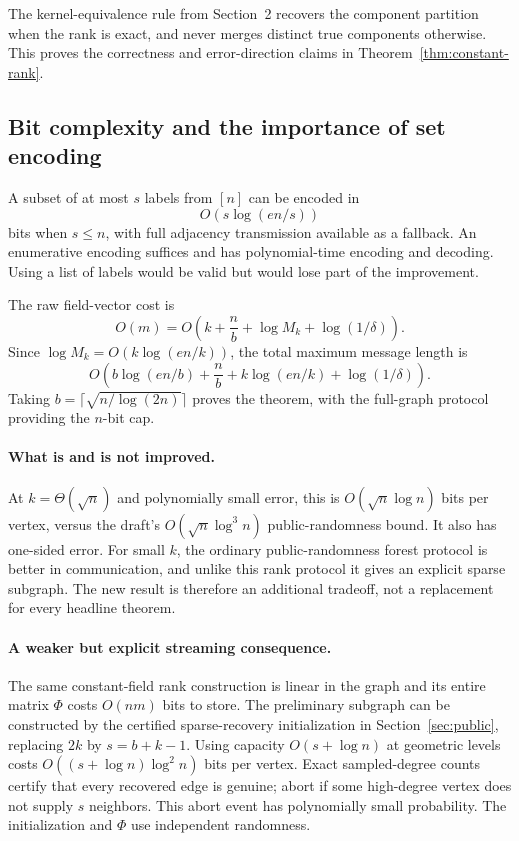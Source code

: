 \documentclass[11pt]{article}
\theoremstyle{remark}\newtheorem{remark}[theorem]{Remark}
\begin{document}
The kernel-equivalence rule from Section~2 recovers the component partition when the rank is exact, and never merges distinct true components otherwise. This proves the correctness and error-direction claims in Theorem~\ref{thm:constant-rank}.

\subsection{Bit complexity and the importance of set encoding}
A subset of at most $s$ labels from $[n]$ can be encoded in
\[
 O\!\left(s\log(en/s)\right)
\]
bits when $s\le n$, with full adjacency transmission available as a fallback. An enumerative encoding suffices and has polynomial-time encoding and decoding. Using a list of labels would be valid but would lose part of the improvement.

The raw field-vector cost is
\[
 O(m)=O\!\left(k+\frac nb+\log M_k+\log(1/\delta)\right).
\]
Since $\log M_k=O(k\log(en/k))$, the total maximum message length is
\[
 O\!\left(
 b\log(en/b)+\frac nb+k\log(en/k)+\log(1/\delta)
 \right).
\]
Taking $b=\lceil\sqrt{n/\log(2n)}\rceil$ proves the theorem, with the full-graph protocol providing the $n$-bit cap.

\paragraph{What is and is not improved.}
At $k=\Theta(\sqrt n)$ and polynomially small error, this is $O(\sqrt n\log n)$ bits per vertex, versus the draft's $O(\sqrt n\log^3n)$ public-randomness bound. It also has one-sided error. For small $k$, the ordinary public-randomness forest protocol is better in communication, and unlike this rank protocol it gives an explicit sparse subgraph. The new result is therefore an additional tradeoff, not a replacement for every headline theorem.

\paragraph{A weaker but explicit streaming consequence.}
The same constant-field rank construction is linear in the graph and its entire matrix $\Phi$ costs $O(nm)$ bits to store. The preliminary subgraph can be constructed by the certified sparse-recovery initialization in Section~\ref{sec:public}, replacing $2k$ by $s=b+k-1$. Using capacity $O(s+\log n)$ at geometric levels costs $O((s+\log n)\log^2n)$ bits per vertex. Exact sampled-degree counts certify that every recovered edge is genuine; abort if some high-degree vertex does not supply $s$ neighbors. This abort event has polynomially small probability. The initialization and $\Phi$ use independent randomness.
\end{document}
